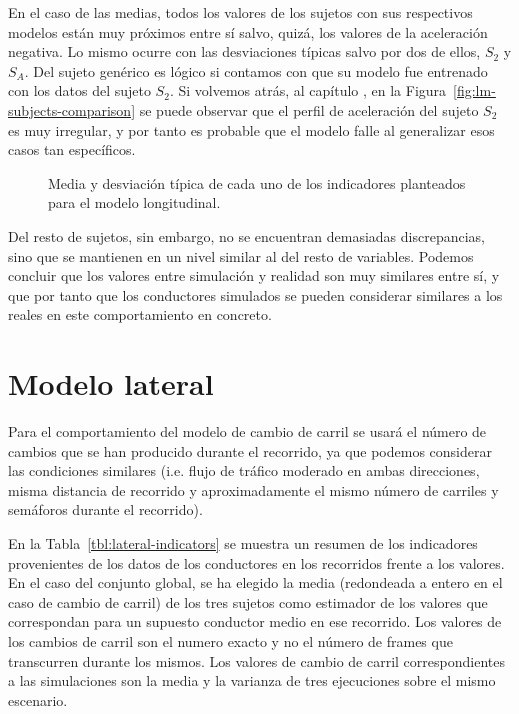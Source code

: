 En el caso de las medias, todos los valores de los sujetos con sus respectivos modelos están muy próximos entre sí salvo, quizá, los valores de la aceleración negativa. Lo mismo ocurre con las desviaciones típicas salvo por dos de ellos, $S_2$ y $S_A$. Del sujeto genérico es lógico si contamos con que su modelo fue entrenado con los datos del sujeto $S_2$. Si volvemos atrás, al capítulo , en la Figura~\ref{fig:lm-subjects-comparison} se puede observar que el perfil de aceleración del sujeto $S_2$ es muy irregular, y por tanto es probable que el modelo falle al generalizar esos casos tan específicos.

\begin{figure}
	\centering
	\qquad
	\qquad
	\caption[Medias y desviaciones típicas de los indicadores del modelo longitudinal]{Media y desviación típica de cada uno de los indicadores planteados para el modelo longitudinal.}
	\label{fig:lc-global-comparison-indicators}
\end{figure}

Del resto de sujetos, sin embargo, no se encuentran demasiadas discrepancias, sino que se mantienen en un nivel similar al del resto de variables. Podemos concluir que los valores entre simulación y realidad son muy similares entre sí, y que por tanto que los conductores simulados se pueden considerar similares a los reales en este comportamiento en concreto.



\section{Modelo lateral}

Para el comportamiento del modelo de cambio de carril se usará el número de cambios que se han producido durante el recorrido, ya que podemos considerar las condiciones similares (i.e. flujo de tráfico moderado en ambas direcciones, misma distancia de recorrido y aproximadamente el mismo número de carriles y semáforos durante el recorrido).

En la Tabla~\ref{tbl:lateral-indicators} se muestra un resumen de los indicadores provenientes de los datos de los conductores en los recorridos frente a los valores. En el caso del conjunto global, se ha elegido la media (redondeada a entero en el caso de cambio de carril) de los tres sujetos como estimador de los valores que correspondan para un supuesto conductor medio en ese recorrido. Los valores de los cambios de carril son el numero exacto y no el número de frames que transcurren durante los mismos. Los valores de cambio de carril correspondientes a las simulaciones son la media y la varianza de tres ejecuciones sobre el mismo escenario.

